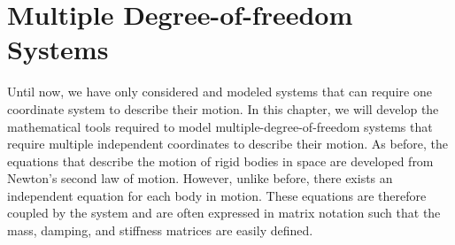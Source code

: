 \documentclass[12pt,letter]{article}
\begin{document}
	
	\setcounter{section}{4}	
	\setcounter{figure}{0}   
	\renewcommand\thefigure{\thesection.\arabic{figure}}
	\setcounter{equation}{0}   
	\renewcommand\theequation{\thesection.\arabic{equation}}

 \section{Multiple Degree-of-freedom Systems}



Until now, we have only considered and modeled systems that can require one coordinate system to describe their motion. In this chapter, we will develop the mathematical tools required to model multiple-degree-of-freedom systems that require multiple independent coordinates to describe their motion. As before, the equations that describe the motion of rigid bodies in space are developed from Newton's second law of motion. However, unlike before, there exists an independent equation for each body in motion. These equations are therefore coupled by the system and are often expressed in matrix notation such that the mass, damping, and stiffness matrices are easily defined. 
\end{document}
